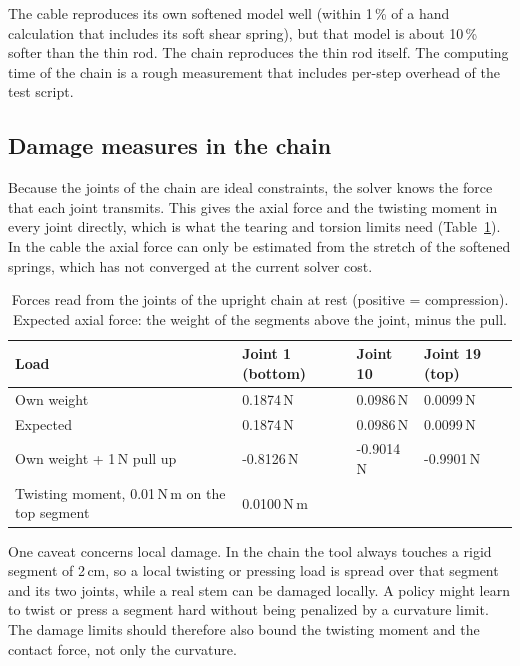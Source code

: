 \documentclass[11pt,a4paper]{article}
\begin{document}
The cable reproduces its own softened model well (within 1\,\% of a hand calculation that includes its soft
shear spring), but that model is about 10\,\% softer than the thin rod. The chain reproduces the thin rod itself.
The computing time of the chain is a rough measurement that includes per-step overhead of the test script.

\subsection{Damage measures in the chain}

Because the joints of the chain are ideal constraints, the solver knows the force that each joint transmits. This
gives the axial force and the twisting moment in every joint directly, which is what the tearing and torsion
limits need (Table~\ref{tab:chain-forces}). In the cable the axial force can only be estimated from the
stretch of the softened springs, which has not converged at the current solver cost.

\begin{table}[h]
  \centering
  \caption{Forces read from the joints of the upright chain at rest (positive = compression). Expected axial
           force: the weight of the segments above the joint, minus the pull.}
  \label{tab:chain-forces}
  \begin{tabular}{llll}
    \toprule
    Load & Joint 1 (bottom) & Joint 10 & Joint 19 (top) \\
    \midrule
    Own weight                  & 0.1874\,N  & 0.0986\,N  & 0.0099\,N \\
    Expected                    & 0.1874\,N  & 0.0986\,N  & 0.0099\,N \\
    Own weight + 1\,N pull up   & -0.8126\,N & -0.9014\,N & -0.9901\,N \\
    \midrule
    Twisting moment, 0.01\,N\,m on the top segment & 0.0100\,N\,m & & \\
    \bottomrule
  \end{tabular}
\end{table}

One caveat concerns local damage. In the chain the tool always touches a rigid segment of 2\,cm, so a local
twisting or pressing load is spread over that segment and its two joints, while a real stem can be damaged
locally. A policy might learn to twist or press a segment hard without being penalized by a curvature limit.
The damage limits should therefore also bound the twisting moment and the contact force, not only the
curvature.
\end{document}
